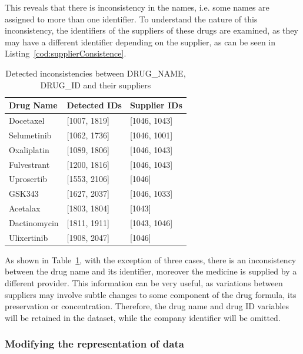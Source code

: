 This reveals that there is inconsistency in the names, i.e. some names are assigned to more than one identifier. To understand the nature of this inconsistency, the identifiers of the suppliers of these drugs are examined, as they may have a different identifier depending on the supplier, as can be seen in Listing~\ref{cod:supplierConsistence}.

\begin{table}[H]
    \centering
    \begin{tabular}{|l|l|l|}
    \hline
    \textbf{Drug Name} & \textbf{Detected IDs} & \textbf{Supplier IDs} \\ \hline
    Docetaxel & [1007, 1819] & [1046, 1043] \\ \hline
    Selumetinib & [1062, 1736] & [1046, 1001] \\ \hline
    Oxaliplatin & [1089, 1806] & [1046, 1043] \\ \hline
    Fulvestrant & [1200, 1816] & [1046, 1043] \\ \hline
    Uprosertib & [1553, 2106] & [1046] \\ \hline
    GSK343 & [1627, 2037] & [1046, 1033] \\ \hline
    Acetalax & [1803, 1804] & [1043] \\ \hline
    Dactinomycin & [1811, 1911] & [1043, 1046] \\ \hline
    Ulixertinib & [1908, 2047] & [1046] \\ \hline
    \end{tabular}
    \caption{Detected inconsistencies between DRUG\_NAME, DRUG\_ID and their suppliers}
    \label{tab:drug_id_supplier}
\end{table}

As shown in Table~\ref{tab:drug_id_supplier}, with the exception of three cases, there is an inconsistency between the drug name and its identifier, moreover the medicine is supplied by a different provider. This information can be very useful, as variations between suppliers may involve subtle changes to some component of the drug formula, its preservation or concentration. Therefore, the drug name and drug ID variables will be retained in the dataset, while the company identifier will be omitted.

\subsubsection{Modifying the representation of data}

